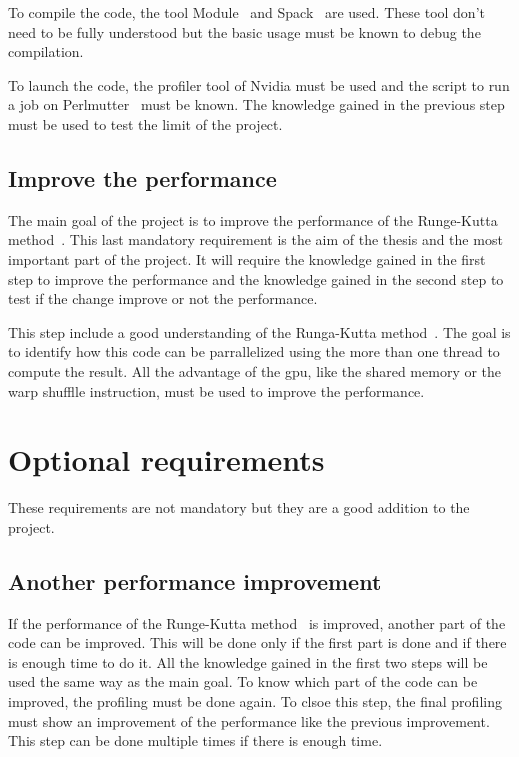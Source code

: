 To compile the code, the tool Module~\cite{Module} and Spack~\cite{Spack} are used.
These tool don't need to be fully understood but the basic usage must be known to debug the compilation.

To launch the code, the profiler tool of Nvidia must be used and the script to run a job on Perlmutter~\cite{Perlmutter} must be known.
The knowledge gained in the previous step must be used to test the limit of the project.


\subsection{Improve the performance}
\label{spec:ch:goals:mandatory-requirements:improve-the-performance}

The main goal of the project is to improve the performance of the Runge-Kutta method~\cite{Runge-Kutta-methods}.
This last mandatory requirement is the aim of the thesis and the most important part of the project.
It will require the knowledge gained in the first step to improve the performance and the knowledge gained in the second step to test if the change improve or not the performance.

This step include a good understanding of the Runga-Kutta method~\cite{Runge-Kutta-methods}.
The goal is to identify how this code can be parrallelized using the more than one thread to compute the result.
All the advantage of the \acrshort{gpu}, like the shared memory or the warp shufflle instruction, must be used to improve the performance.


\section{Optional requirements}
\label{spec:ch:goals:optional-requirements}

These requirements are not mandatory but they are a good addition to the project.

\subsection{Another performance improvement}
\label{spec:ch:goals:optional-requirements:another-performance-improvement}

If the performance of the Runge-Kutta method~\cite{Runge-Kutta-methods} is improved, another part of the code can be improved.
This will be done only if the first part is done and if there is enough time to do it.
All the knowledge gained in the first two steps will be used the same way as the main goal.
To know which part of the code can be improved, the profiling must be done again.
To clsoe this step, the final profiling must show an improvement of the performance like the previous improvement.
This step can be done multiple times if there is enough time.

